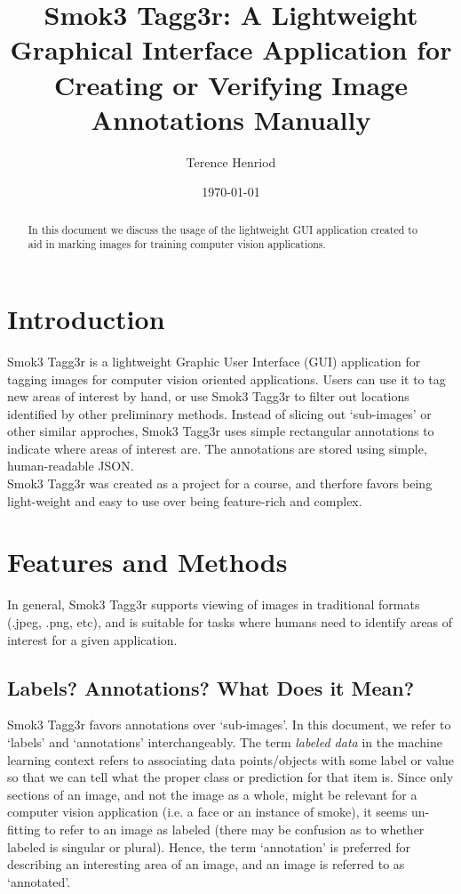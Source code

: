 \documentclass{article}
\title{Smok3 Tagg3r: A Lightweight Graphical Interface Application for Creating or Verifying Image Annotations Manually}
\author{Terence Henriod}
\date{\today}
\begin{document}
%
\clearpage            %
\maketitle            %
\thispagestyle{empty} %
%
\begin{abstract}
In this document we discuss the usage of the lightweight GUI application created to aid in marking images for training computer vision applications.
\end{abstract}

\newpage
\section{Introduction}
Smok3 Tagg3r is a lightweight Graphic User Interface (GUI) application for tagging images for computer vision oriented applications. Users can use it to tag new areas of interest by hand, or use Smok3 Tagg3r to filter out locations identified by other preliminary methods. Instead of slicing out `sub-images' or other similar approches, Smok3 Tagg3r uses simple rectangular annotations to indicate where areas of interest are. The annotations are stored using simple, human-readable JSON.\\

Smok3 Tagg3r was created as a project for a course, and therfore favors being light-weight and easy to use over being feature-rich and complex.

\section{Features and Methods}
In general, Smok3 Tagg3r supports viewing of images in traditional formats (.jpeg, .png, etc), and is suitable for tasks where humans need to identify areas of interest for a given application.

\subsection{Labels? Annotations? What Does it Mean?}
Smok3 Tagg3r favors annotations over `sub-images'. In this document, we refer to `labels' and `annotations' interchangeably. The term \emph{labeled data} in the machine learning context refers to associating data points/objects with some label or value so that we can tell what the proper class or prediction for that item is. Since only sections of an image, and not the image as a whole, might be relevant for a computer vision application (i.e. a face or an instance of smoke), it seems un-fitting to refer to an image as labeled (there may be confusion as to whether labeled is singular or plural). Hence, the term `annotation' is preferred for describing an interesting area of an image, and an image is referred to as `annotated'.\\
\end{document}
